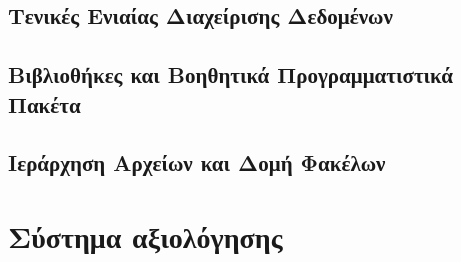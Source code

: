 \subsubsection{}



\subsubsection{}


\subsubsection{}


\subsubsection{}


\subsection{Τενικές Ενιαίας Διαχείρισης Δεδομένων}



\subsubsection{}



\subsubsection{}




\subsection{Βιβλιοθήκες και Βοηθητικά Προγραμματιστικά Πακέτα}





\subsection{Ιεράρχηση Αρχείων και Δομή Φακέλων}

\section{Σύστημα αξιολόγησης}

